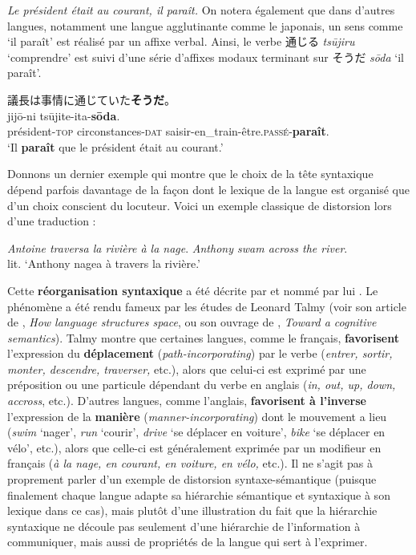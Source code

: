 {    \ea
    \textit{{Le président était au courant, il paraît.}}
    \z
    On notera également que dans d’autres langues, notamment une langue agglutinante comme le japonais, un sens comme ‘il paraît’ est réalisé par un affixe verbal. Ainsi, le verbe {\cjkfont 通じる} \textit{tsūjiru} ‘comprendre’ est suivi d’une série d’affixes modaux terminant sur {\cjkfont そうだ} \textit{sōda} ‘il paraît’.
    
    \ea\relax
    {\cjkfont 議長は事情に通じていた\textbf{そうだ}。}\\
      {jijō-ni}  {tsūjite-ita-\textbf{sōda}}.\\
    président-\textsc{top} circonstances-\textsc{dat} saisir-en\_train-être.\textsc{passé}-\textbf{paraît}.\\
    \glt ‘Il \textbf{paraît} que le président était au courant.’
    \z

    Donnons un dernier exemple qui montre que le choix de la tête syntaxique dépend parfois davantage de la façon dont le lexique de la langue est organisé que d’un choix conscient du locuteur. Voici un exemple classique de distorsion lors d’une traduction :
    
    \ea
    \ea\textit{Antoine traversa la rivière à la nage}.
    \ex\textit{Anthony swam across the river}.\\
    lit. `Anthony nagea à travers la rivière.'\z
    \z

    Cette \textbf{réorganisation syntaxique} a été décrite par \citet[chapitre 131]{tesniere1959elements} et nommé par lui . Le phénomène a été rendu fameux par les études de Leonard Talmy (voir son article de \citeyear{talmy1983language}, \textit{How language structures space}, ou son ouvrage de \citeyear{talmy2000toward}, \textit{Toward a cognitive semantics}). Talmy montre que certaines langues, comme le français, \textbf{favorisent} l'expression du \textbf{déplacement} (\textit{path-incorporating}) par le verbe (\textit{entrer, sortir, monter, descendre, traverser,} etc.), alors que celui-ci est exprimé par une préposition ou une particule dépendant du verbe en anglais (\textit{in, out, up, down, accross}, etc.). D’autres langues, comme l’anglais, \textbf{favorisent à l’inverse} l'expression de la \textbf{manière} (\textit{manner-incorporating}) dont le mouvement a lieu (\textit{swim} ‘nager’, \textit{run} ‘courir’, \textit{drive} ‘se déplacer en voiture’, \textit{bike} ‘se déplacer en vélo’, etc.), alors que celle-ci est généralement exprimée par un modifieur en français (\textit{à la nage, en courant, en voiture, en vélo,} etc.). Il ne s’agit pas à proprement parler d’un exemple de distorsion syntaxe-sémantique (puisque finalement chaque langue adapte sa hiérarchie sémantique et syntaxique à son lexique dans ce cas), mais plutôt d’une illustration du fait que la hiérarchie syntaxique ne découle pas seulement d’une hiérarchie de l’information à communiquer, mais aussi de propriétés de la langue qui sert à l’exprimer.
}



